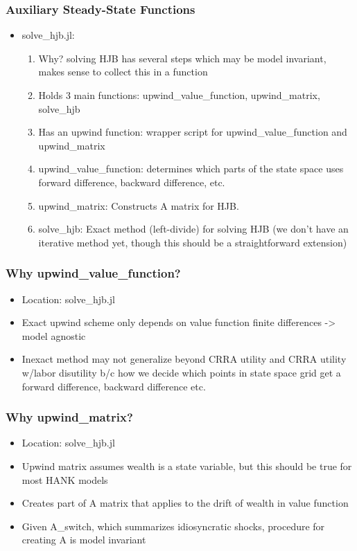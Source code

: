 \documentclass{beamer}
\begin{document}
\begin{frame}
\frametitle{Auxiliary Steady-State Functions}
\begin{itemize}
\item solve\_hjb.jl:
  \begin{enumerate}
  \item Why? solving HJB has several steps which may be model invariant, makes sense to collect this in a function
  \item Holds 3 main functions: upwind\_value\_function, upwind\_matrix, solve\_hjb
  \item Has an upwind function: wrapper script for upwind\_value\_function and upwind\_matrix
  \item upwind\_value\_function: determines which parts of the state space uses forward difference, backward difference, etc.
  \item upwind\_matrix: Constructs A matrix for HJB.
  \item solve\_hjb: Exact method (left-divide) for solving HJB (we don't have an iterative method yet, though this should be a straightforward extension)
  \end{enumerate}
\end{itemize}
\end{frame}
\begin{frame}
  \frametitle{Why upwind\_value\_function?}
\begin{itemize}
  \item Location: solve\_hjb.jl
\item Exact upwind scheme only depends on value function finite differences -> model agnostic
\item Inexact method may not generalize beyond CRRA utility and CRRA utility w/labor disutility b/c how we decide which points in state space grid get a forward difference, backward difference etc.
\end{itemize}
\end{frame}
\begin{frame}
  \frametitle{Why upwind\_matrix?}
  \begin{itemize}
  \item Location: solve\_hjb.jl
  \item Upwind matrix assumes wealth is a state variable, but this should be true for most HANK models
  \item Creates part of A matrix that applies to the drift of wealth in value function
  \item Given A\_switch, which summarizes idiosyncratic shocks, procedure for creating A is model invariant
  \end{itemize}
\end{frame}
\end{document}
